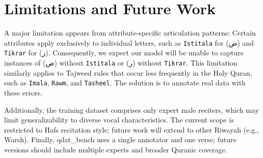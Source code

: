 \section{Limitations and Future Work}
\label{sec:limitations}
A major limitation appears from attribute-specific articulation patterns: Certain attributes apply exclusively to individual letters, such as \texttt{Istitala} for (ض) and \texttt{Tikrar} for (ر). Consequently, we expect our model will be unable to capture instances of (ض) without \texttt{Istitala} or (ر) without \texttt{Tikrar}. This limitation similarly applies to Tajweed rules that occur less frequently in the Holy Quran, such as \texttt{Imala}, \texttt{Rawm}, and \texttt{Tasheel}. The solution is to annotate real data with these errors.

Additionally, the training dataset comprises only expert male reciters, which may limit generalizability to diverse vocal characteristics. The current scope is restricted to Hafs recitation style; future work will extend to other Riwayah (e.g., Warsh). Finally, qdat\_bench uses a single annotator and one verse; future versions should include multiple experts and broader Quranic coverage.

